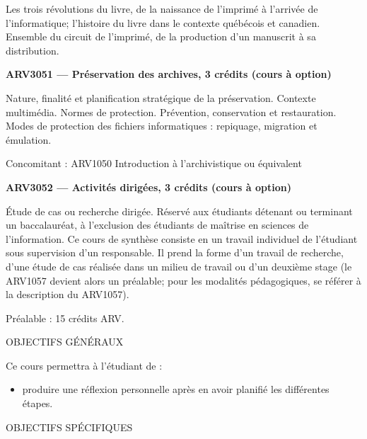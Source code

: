 \documentclass [12 pt]{article}
\begin{document}
            Les trois révolutions du livre, de la naissance de l'imprimé à l'arrivée de
                l'informatique; l'histoire du livre dans le contexte québécois et canadien. Ensemble
                du circuit de l'imprimé, de la production d'un manuscrit à sa distribution.
            
        \textbf{
        ARV3051 — Préservation des archives, 3 crédits (cours à option)
        }
    
            Nature, finalité et planification stratégique de la préservation. Contexte
                multimédia. Normes de protection. Prévention, conservation et restauration. Modes de
                protection des fichiers informatiques : repiquage, migration et émulation.
            
                Concomitant : ARV1050 Introduction à l'archivistique ou équivalent
            
            
        \textbf{
        ARV3052 — Activités dirigées, 3 crédits (cours à option)
        }
    
            Étude de cas ou recherche dirigée. Réservé aux étudiants détenant ou terminant un
                baccalauréat, à l'exclusion des étudiants de maîtrise en sciences de l'information.
                Ce cours de synthèse consiste en un travail individuel de l'étudiant sous
                supervision d'un responsable. Il prend la forme d'un travail de recherche, d'une
                étude de cas réalisée dans un milieu de travail ou d'un deuxième stage (le ARV1057
                devient alors un préalable; pour les modalités pédagogiques, se référer à la
                description du ARV1057).
            
                Préalable : 15 crédits ARV.
            
            
                OBJECTIFS GÉNÉRAUX
            
            Ce cours permettra à l'étudiant de :
            
        \begin{itemize}
        
                
        \item produire une réflexion personnelle après en avoir planifié les différentes
                    étapes.
            
        \end{itemize}
    
            
                OBJECTIFS SPÉCIFIQUES
            
\end{document}
